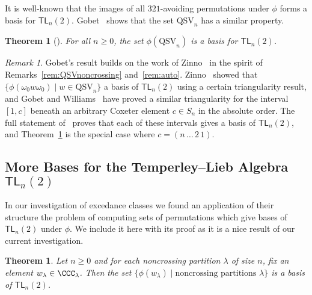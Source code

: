 \documentclass[submission]{FPSAC2024}
\newtheorem{thm}[equation]{Theorem}
\theoremstyle{definition}
\theoremstyle{remark}
\newtheorem{rem}[equation]{Remark}
\numberwithin{equation}{section}
\newcommand{\TL}{\mathsf{TL}}
\newcommand{\QSV}{\mathrm{QSV}}
\begin{document}
It is well-known that the images of all $321$-avoiding permutations under $\phi$ forms a basis for $\TL_{n}(2)$.  
Gobet~\cite{Gobet} shows that the set $\QSV_{n}$ has a similar property.


\begin{thm}[{\cite[Theorem 7.21]{Gobet}}]
\label{thm:TLbasis}
For all $n \ge 0$, the set $\phi(\QSV_{n})$ is a basis for $\TL_{n}(2)$.
\end{thm}

\begin{rem}
Gobet's result builds on the work of Zinno~\cite{Z02} in the spirit of Remarks~\ref{rem:QSVnoncrossing} and~\ref{rem:auto}. 
Zinno~\cite[Theorem 2]{Z02} showed that $\{\phi(\omega_0w\omega_0) \;|\; w \in \QSV_{n}\}$ a basis of $\TL_{n}(2)$ using a certain triangularity result, and Gobet and Williams~\cite{GW16} have proved a similar triangularity for the interval $[1, c]$ beneath an arbitrary Coxeter element $c \in S_{n}$ in the absolute order.  
The full statement of~\cite[Theorem 7.21]{Gobet} proves that each of these intervals gives a basis of $\TL_{n}(2)$, and Theorem~\ref{thm:TLbasis} is the special case where $c = (n\,\ldots\,2\,1)$.
\end{rem}

\subsection{More Bases for the Temperley--Lieb Algebra $\TL_{n}(2)$}

In our investigation of excedance classes we found an application of their structure the problem of computing sets of permutations which give bases of $\TL_{n}(2)$ under $\phi$.  
We include it here with its proof as it is a nice result of our current investigation.

\begin{thm}
\label{thm:TLbases}
Let $n \ge 0$ and for each noncrossing partition $\lambda$ of size $n$, fix an element $w_{\lambda} \in \CCC_{\lambda}$. Then the set $\{\phi(w_{\lambda}) \;|\; \text{noncrossing partitions $\lambda$}\}$ is a basis of $\TL_{n}(2)$.
\end{thm}
\end{document}
